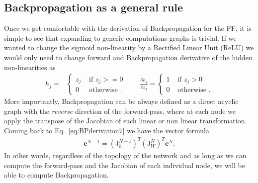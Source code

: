 \subsection{Backpropagation as a general rule}
%
Once we get comfortable with the derivation of Backpropagation for the FF, it is simple to see that expanding to generic computations graphs is trivial. If we wanted to change the sigmoid non-linearity by a Rectified Linear Unit (ReLU) we would only need to change forward and Backpropagation derivative of the hidden non-linearities as
\begin{align}
 h_j =
  &\begin{cases}
      z_j  &  \mbox{ if } z_j >= 0\\
      0  &  \mbox{ otherwise }.
  \end{cases} \quad \quad \frac{\partial h_{j}}{\partial z_{j}} = \begin{cases}
      1  &  \mbox{ if } z_j > 0\\
      0  &  \mbox{ otherwise }.
  \end{cases}
  \label{eqn:relu}
\end{align}
%
More importantly, Backpropagation can be always defined as a direct acyclic graph with the \textit{reverse} direction of the forward-pass, where at each node we apply the transpose of the Jacobian of each linear or non linear transformation. Coming back to Eq.~\ref{eq:BPderivation7} we have the vector formula
%
\begin{align}
        \mathbf{e}^{N-1} = \left(\mathbf{\mathrm{J}}_{h}^{N-1}\right)^T \left(\mathbf{\mathrm{J}}_{W}^N\right)^T \mathbf{e}^N.
\label{eq:BPderivation5}
\end{align}
%
In other words, regardless of the topology of the network and as long as we can compute the forward-pass and the Jacobian of each individual node, we will be able to compute Backpropagation.
